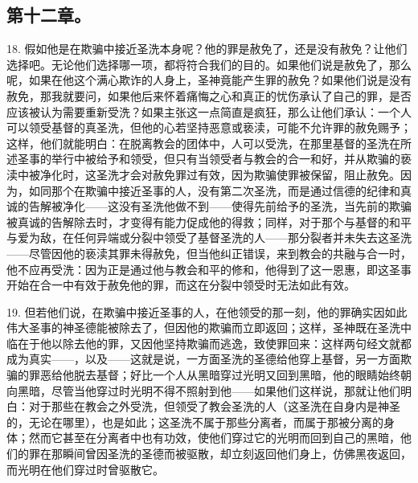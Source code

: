 
\subsection{第十二章。}

18. 假如他是在欺骗中接近圣洗本身呢？他的罪是赦免了，还是没有赦免？让他们选择吧。无论他们选择哪一项，都将符合我们的目的。如果他们说是赦免了，那么  呢，如果在他这个满心欺诈的人身上，圣神竟能产生罪的赦免？如果他们说是没有赦免，那我就要问，如果他后来怀着痛悔之心和真正的忧伤承认了自己的罪，是否应该被认为需要重新受洗？如果主张这一点简直是疯狂，那么让他们承认：一个人可以领受基督的真圣洗，但他的心若坚持恶意或亵渎，可能不允许罪的赦免赐予；这样，他们就能明白：在脱离教会的团体中，人可以受洗，在那里基督的圣洗在所述圣事的举行中被给予和领受，但只有当领受者与教会的合一和好，并从欺骗的亵渎中被净化时，这圣洗才会对赦免罪过有效，因为欺骗使罪被保留，阻止赦免。因为，如同那个在欺骗中接近圣事的人，没有第二次圣洗，而是通过信德的纪律和真诚的告解被净化——这没有圣洗他做不到——使得先前给予的圣洗，当先前的欺骗被真诚的告解除去时，才变得有能力促成他的得救；同样，对于那个与基督的和平与爱为敌，在任何异端或分裂中领受了基督圣洗的人——那分裂者并未失去这圣洗——尽管因他的亵渎其罪未得赦免，但当他纠正错误，来到教会的共融与合一时，他不应再受洗：因为正是通过他与教会和平的修和，他得到了这一恩惠，即这圣事开始在合一中有效于赦免他的罪，而这在分裂中领受时无法如此有效。\par

19. 但若他们说，在欺骗中接近圣事的人，在他领受的那一刻，他的罪确实因如此伟大圣事的神圣德能被除去了，但因他的欺骗而立即返回；这样，圣神既在圣洗中临在于他以除去他的罪，又因他坚持欺骗而逃逸，致使罪回来：这样两句经文就都成为真实——，以及——这就是说，一方面圣洗的圣德给他穿上基督，另一方面欺骗的罪恶给他脱去基督；好比一个人从黑暗穿过光明又回到黑暗，他的眼睛始终朝向黑暗，尽管当他穿过时光明不得不照射到他——如果他们这样说，那就让他们明白：对于那些在教会之外受洗，但领受了教会圣洗的人（这圣洗在自身内是神圣的，无论在哪里），也是如此；这圣洗不属于那些分离者，而属于那被分离的身体；然而它甚至在分离者中也有功效，使他们穿过它的光明而回到自己的黑暗，他们的罪在那瞬间曾因圣洗的圣德而被驱散，却立刻返回他们身上，仿佛黑夜返回，而光明在他们穿过时曾驱散它。\par

